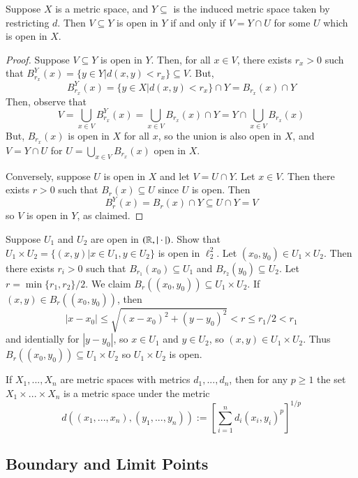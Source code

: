 \begin{prop}
    Suppose $X$ is a metric space, and $Y \subseteq$ is the induced metric space taken by restricting $d$. Then $V \subseteq Y$ is open in $Y$ if and only if $V = Y\cap U$ for some $U$ which is open in $X$.
\end{prop}
\begin{proof}
    Suppose $V \subseteq Y$ is open in $Y$. Then, for all $x \in V$, there exists $r_x > 0$ such that $B_{r_x}^Y(x) = \{y \in Y\vert d(x,y) <r_x\} \subseteq V$. But, $$B_{r_x}^Y(x) = \{y \in X\vert d(x,y) <r_x\}\cap Y = B_{r_x}(x)\cap Y$$ Then, observe that $$V = \bigcup_{x \in V}B_{r_x}^Y(x) = \bigcup_{x \in V}B_{r_x}(x)\cap Y = Y\cap \bigcup_{x\in V}B_{r_x}(x)$$ But, $B_{r_x}(x)$ is open in $X$ for all $x$, so the union is also open in $X$, and $V = Y\cap U$ for $U = \bigcup_{x \in V}B_{r_x}(x)$ open in $X$.

    Conversely, suppose $U$ is open in $X$ and let $V = U\cap Y$. Let $x \in V$. Then there exists $r > 0$ such that $B_r(x) \subseteq U$ since $U$ is open. Then $$B_r^Y(x) = B_r(x)\cap Y \subseteq U\cap Y = V$$ so $V$ is open in $Y$, as claimed.
\end{proof}

\begin{eg}
    Suppose $U_1$ and $U_2$ are open in $(\mathbb R,|\cdot |)$. Show that $U_1\times U_2 = \{(x,y)\vert x \in U_1,y \in U_2\}$ is open in $\ell_2^2$. Let $(x_0,y_0) \in U_1\times U_2$. Then there exists $r_i > 0$ such that $B_{r_1}(x_0) \subseteq U_1$ and $B_{r_2}(y_0) \subseteq U_2$. Let $r = \min\{r_1,r_2\}/2$. We claim $B_r((x_0,y_0)) \subseteq U_1\times U_2$. If $(x,y) \in B_r((x_0,y_0))$, then $$|x-x_0| \leq \sqrt{(x-x_0)^2+(y-y_0)^2} < r \leq r_1/2 < r_1$$ and identially for $|y-y_0|$, so $x \in U_1$ and $y \in U_2$, so $(x,y) \in U_1\times U_2$. Thus $B_r((x_0,y_0)) \subseteq U_1\times U_2$ so $U_1\times U_2$ is open.
\end{eg}

If $X_1,...,X_n$ are metric spaces with metrics $d_1,...,d_n$, then for any $p\geq 1$ the set $X_1\times...\times X_n$ is a metric space under the metric $$d\left((x_1,...,x_n),(y_1,...,y_n)\right) :=\left[\sum_{i=1}^nd_i(x_i,y_i)^p\right]^{1/p}$$

\subsection{Boundary and Limit Points}


